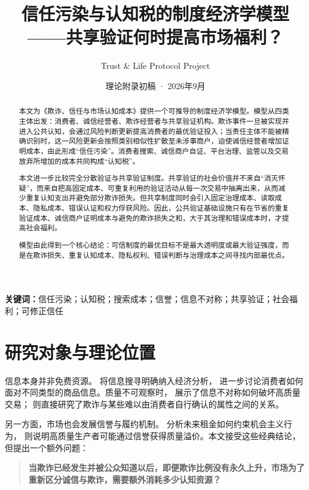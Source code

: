 \documentclass[UTF8,12pt]{ctexart}
\title{\textbf{信任污染与认知税的制度经济学模型}\\[0.6em]
\large ——共享验证何时提高市场福利？}
\author{Trust \& Life Protocol Project}
\date{理论附录初稿 · 2026年9月}
\begin{document}
\maketitle

\begin{abstract}
本文为《欺诈、信任与市场认知成本》提供一个可推导的制度经济学模型。模型从四类主体出发：消费者、诚信经营者、欺诈经营者与共享验证机构。欺诈事件一旦被实现并进入公共认知，会通过风险判断更新提高消费者的最优验证投入；当责任主体不能被精确识别时，这一风险更新会按照类别相似性扩散至未涉事商户，迫使诚信经营者增加证明成本，由此形成“信任污染”。消费者搜索、诚信商户自证、平台治理、监管以及交易放弃所增加的成本共同构成“认知税”。

本文进一步比较完全分散验证与共享验证制度。共享验证的社会价值并不来自“消灭怀疑”，而来自把高固定成本、可重复利用的验证活动从每一次交易中抽离出来，从而减少重复认知支出并避免部分欺诈损失。但共享制度同时会引入固定治理成本、读取成本、隐私成本、错误认证和权力俘获风险。因此，公共验证基础设施只有在节省的重复验证成本、诚信商户证明成本与避免的欺诈损失之和，大于其治理和错误成本时，才提高社会福利。

模型由此得到一个核心结论：可信制度的最优目标不是最大透明度或最大验证强度，而是在欺诈损失、重复认知成本、隐私权利、错误判断与治理成本之间寻找内部最优点。
\end{abstract}

\noindent\textbf{关键词：}信任污染；认知税；搜索成本；信誉；信息不对称；共享验证；社会福利；可修正信任

\section{研究对象与理论位置}

信息本身并非免费资源。\citet{stigler1961information} 将信息搜寻明确纳入经济分析，\citet{nelson1970consumer} 进一步讨论消费者如何面对不同类型的商品信息。质量不可观察时，\citet{akerlof1970lemons} 展示了信息不对称如何破坏高质量交易；\citet{darbykarni1973fraud} 则直接研究了欺诈与某些难以由消费者自行确认的属性之间的关系。

另一方面，市场也会发展信誉与履约机制。\citet{kleinleffler1981performance} 分析未来租金如何约束机会主义行为，\citet{shapiro1983reputation} 则说明高质量生产者可能通过信誉获得质量溢价。本文接受这些经典结论，但提出一个额外问题：

\begin{quote}
\textbf{当欺诈已经发生并被公众知道以后，即便欺诈比例没有永久上升，市场为了重新区分诚信与欺诈，需要额外消耗多少认知资源？}
\end{quote}
\end{document}
